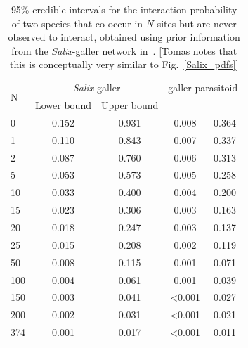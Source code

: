 \documentclass[12pt]{article}
\begin{document}

      \begin{table}[h]
        \caption{95\% credible intervals for the interaction probability of two species that co-occur in $N$ sites but are never observed to interact, obtained using prior information from the \emph{Salix}-galler network in~\citet{Barbour2016,Barbour2016Dryad}. [Tomas notes that this is conceptually very similar to Fig.~\ref{Salix_pdfs}]}
        \label{interval_table}
        \begin{tabular}{l | c c | c c }
        \multirow{2}{*}{N} & \multicolumn{2}{c}{\emph{Salix}-galler} & \multicolumn{2}{c}{galler-parasitoid}\\
         & Lower bound & Upper bound \\
        \hline
        0   & 0.152 & 0.931 & 0.008 & 0.364 \\
        1   & 0.110 & 0.843 & 0.007 & 0.337 \\
        2   & 0.087 & 0.760 & 0.006 & 0.313 \\
        5   & 0.053 & 0.573 & 0.005 & 0.258 \\
        10  & 0.033 & 0.400 & 0.004 & 0.200 \\
        15  & 0.023 & 0.306 & 0.003 & 0.163 \\
        20  & 0.018 & 0.247 & 0.003 & 0.137 \\
        25  & 0.015 & 0.208 & 0.002 & 0.119 \\
        50  & 0.008 & 0.115 & 0.001 & 0.071 \\
        100 & 0.004 & 0.061 & 0.001 & 0.039 \\
        150 & 0.003 & 0.041 & \textless0.001 & 0.027 \\
        200 & 0.002 & 0.031 & \textless0.001 & 0.021 \\
        \hline
        374 & 0.001 & 0.017 & \textless0.001 & 0.011 \\
        \hline
        \end{tabular}
        \end{table}
\end{document}
